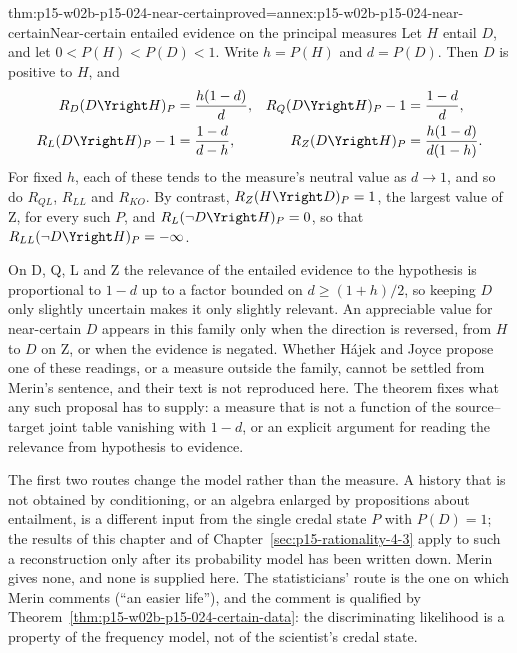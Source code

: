 \begin{hbtheorem}{thm:p15-w02b-p15-024-near-certain}{proved=annex:p15-w02b-p15-024-near-certain}{Near-certain entailed evidence on the principal measures}
Let \(H\) entail \(D\), and let \(0<P(H)<P(D)<1\). Write \(h=P(H)\)
and \(d=P(D)\). Then \(D\) is positive to \(H\), and
\[
 \begin{aligned}
 R_D(D\Yright H)_P&=\frac{h(1-d)}{d},&
 R_Q(D\Yright H)_P-1&=\frac{1-d}{d},\\
 R_L(D\Yright H)_P-1&=\frac{1-d}{d-h},&
 R_Z(D\Yright H)_P&=\frac{h(1-d)}{d(1-h)}.
 \end{aligned}
\]
For fixed \(h\), each of these tends to the measure's neutral value as
\(d\to1\), and so do \(R_{QL}\), \(R_{LL}\) and \(R_{KO}\). By
contrast, \(R_Z(H\Yright D)_P=1\), the largest value of Z, for every
such \(P\), and \(R_L(\neg D\Yright H)_P=0\), so that
\(R_{LL}(\neg D\Yright H)_P=-\infty\).
\end{hbtheorem}

On D, Q, L and Z the relevance of the entailed evidence to the
hypothesis is proportional to \(1-d\) up to a factor bounded on
\(d\geq(1+h)/2\), so keeping \(D\) only slightly uncertain makes it
only slightly relevant. An appreciable value for near-certain \(D\)
appears in this family only when the direction is reversed, from \(H\)
to \(D\) on Z, or when the evidence is negated. Whether H\'ajek and
Joyce propose one of these readings, or a measure outside the family,
cannot be settled from Merin's sentence, and their text is not
reproduced here. The theorem fixes what any such proposal has to
supply: a measure that is not a function of the source--target joint
table vanishing with \(1-d\), or an explicit argument for reading the
relevance from hypothesis to evidence.

The first two routes change the model rather than the measure. A
history that is not obtained by conditioning, or an algebra enlarged
by propositions about entailment, is a different input from the single
credal state \(P\) with \(P(D)=1\); the results of this chapter and of
Chapter~\ref{sec:p15-rationality-4-3} apply to such a reconstruction
only after its probability model has been written down. Merin gives
none, and none is supplied here. The statisticians' route is the one
on which Merin comments (``an easier life''), and the comment is
qualified by Theorem~\ref{thm:p15-w02b-p15-024-certain-data}: the
discriminating likelihood is a property of the frequency model, not of
the scientist's credal state.

